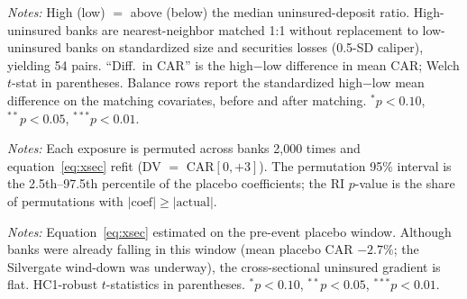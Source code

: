 \documentclass[12pt]{article}
\begin{document}
\begin{table}[htbp]\centering
\begin{threeparttable}
\caption{Matching estimator: high- versus low-uninsured banks}\label{tab:matched}\small

\begin{tablenotes}\small\item \textit{Notes:} High (low) $=$ above (below) the median
uninsured-deposit ratio. High-uninsured banks are nearest-neighbor matched 1:1 without
replacement to low-uninsured banks on standardized size and securities losses (0.5-SD caliper),
yielding 54 pairs. ``Diff.\ in CAR'' is the high$-$low difference in mean CAR; Welch $t$-stat in
parentheses. Balance rows report the standardized high$-$low mean difference on the matching
covariates, before and after matching. $^{*}p<0.10$, $^{**}p<0.05$, $^{***}p<0.01$.
\end{tablenotes}
\end{threeparttable}
\end{table}

\begin{table}[htbp]\centering
\begin{threeparttable}
\caption{Randomization inference (2{,}000 permutations of exposure)}\label{tab:ri}\small

\begin{tablenotes}\small\item \textit{Notes:} Each exposure is permuted across banks 2{,}000
times and equation~\eqref{eq:xsec} refit (DV $=$ CAR$[0,+3]$). The permutation 95\% interval is
the 2.5th--97.5th percentile of the placebo coefficients; the RI $p$-value is the share of
permutations with $|\text{coef}|\geq|\text{actual}|$.
\end{tablenotes}
\end{threeparttable}
\end{table}

\begin{table}[htbp]\centering
\begin{threeparttable}
\caption{Placebo-window falsification (DV $=$ pre-event CAR$[-6,-2]$)}\label{tab:placebo}\small

\begin{tablenotes}\small\item \textit{Notes:} Equation~\eqref{eq:xsec} estimated on the
pre-event placebo window. Although banks were already falling in this window (mean placebo CAR
$-2.7\%$; the Silvergate wind-down was underway), the cross-sectional uninsured gradient is flat.
HC1-robust $t$-statistics in parentheses. $^{*}p<0.10$, $^{**}p<0.05$, $^{***}p<0.01$.
\end{tablenotes}
\end{threeparttable}
\end{table}
\end{document}
